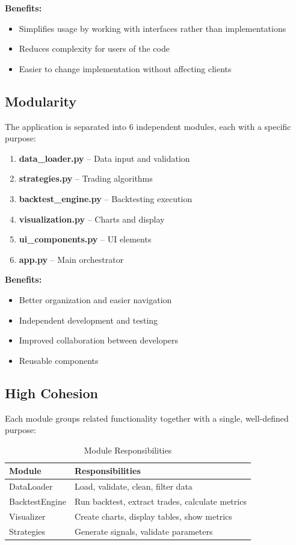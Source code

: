 \documentclass[11pt,a4paper]{article}
\begin{document}
\textbf{Benefits:}
\begin{itemize}[noitemsep]
    \item Simplifies usage by working with interfaces rather than implementations
    \item Reduces complexity for users of the code
    \item Easier to change implementation without affecting clients
\end{itemize}

\subsection{Modularity}

The application is separated into 6 independent modules, each with a specific purpose:

\begin{enumerate}[noitemsep]
    \item \textbf{data\_loader.py} -- Data input and validation
    \item \textbf{strategies.py} -- Trading algorithms
    \item \textbf{backtest\_engine.py} -- Backtesting execution
    \item \textbf{visualization.py} -- Charts and display
    \item \textbf{ui\_components.py} -- UI elements
    \item \textbf{app.py} -- Main orchestrator
\end{enumerate}

\textbf{Benefits:}
\begin{itemize}[noitemsep]
    \item Better organization and easier navigation
    \item Independent development and testing
    \item Improved collaboration between developers
    \item Reusable components
\end{itemize}

\subsection{High Cohesion}

Each module groups related functionality together with a single, well-defined purpose:

\begin{table}[H]
\centering
\begin{tabular}{@{}ll@{}}
\toprule
\textbf{Module} & \textbf{Responsibilities} \\ \midrule
DataLoader & Load, validate, clean, filter data \\
BacktestEngine & Run backtest, extract trades, calculate metrics \\
Visualizer & Create charts, display tables, show metrics \\
Strategies & Generate signals, validate parameters \\ \bottomrule
\end{tabular}
\caption{Module Responsibilities}
\end{table}
\end{document}
